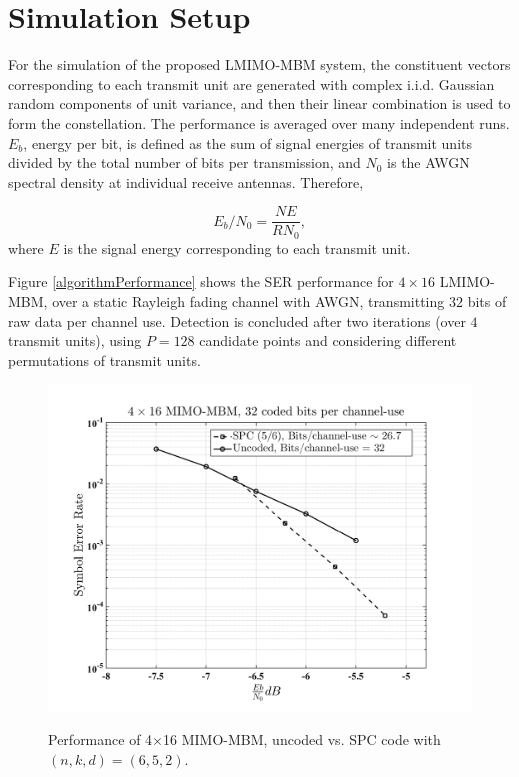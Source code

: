 \section {Simulation Setup}
\label{sec : Simulation Setup}

For the simulation of the proposed LMIMO-MBM system, the constituent vectors corresponding to each transmit unit are generated with complex i.i.d. Gaussian random components of unit variance, and then their linear combination is used to form the constellation. The performance is averaged over many independent runs. $E_b$, energy per bit, is defined as the sum of signal energies of transmit units divided by the total number of bits per transmission, and $N_0$ is the AWGN spectral density at individual receive antennas. Therefore, 

\begin{equation}
\label{ebn0}
E_b/N_0 =\frac{NE}{RN_0},
\end{equation}
where $E$ is the signal energy corresponding to each transmit unit.


Figure \ref{algorithmPerformance} shows the SER performance for $ 4\times 16$ LMIMO-MBM, over a static Rayleigh fading channel with AWGN, transmitting $32$ bits of raw data per channel use. Detection is concluded after two iterations (over $4$ transmit units), using $P = 128$ candidate points and considering different permutations of transmit units.

\begin{figure}[t]
\centering
\vspace{0cm}

{\includegraphics[scale = 0.50]{./fig/spc_vs_uncoded}}
\caption{Performance of 4$\times$16  MIMO-MBM, uncoded vs.  SPC code with $(n, k, d) = (6, 5, 2)$.}

\label{SPC_vs_uncoded}
\end{figure}

